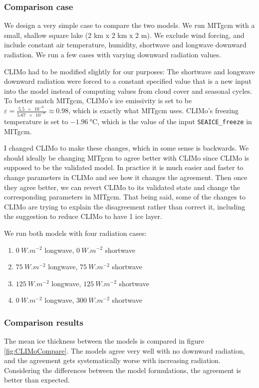 \documentclass[11pt]{article}
\begin{document}
\subsubsection{Comparison case}
We design a very simple case to compare the two models. We run MITgcm with a small, shallow square lake (2 km x 2 km x 2 m). We exclude wind forcing, and include constant air temperature, humidity, shortwave and longwave downward radiation. We run a few cases with varying downward radiation values.

CLIMo had to be modified slightly for our purposes: The shortwave and longwave downward radiation were forced to a constant specified value that is a new input into the model instead of computing values from cloud cover and seasonal cycles. To better match MITgcm, CLIMo's ice emissivity is set to be $\varepsilon = \frac{\SI{5.5e-8}{}}{\SI{5.67e-8}{}} \approx 0.98$, which is exactly what MITgcm uses. CLIMo's freezing temperature is set to $\SI{-1.96}{\celsius}$, which is the value of the input \verb|SEAICE_freeze| in MITgcm.

I changed CLIMo to make these changes, which in some sense is backwards. We should ideally be changing MITgcm to agree better with CLIMo since CLIMo is supposed to be the validated model. In practice it is much easier and faster to change parameters in CLIMo and see how it changes the agreement. Then once they agree better, we can revert CLIMo to its validated state and change the corresponding parameters in MITgcm. That being said, some of the changes to CLIMo are trying to explain the disagreement rather than correct it, including the suggestion to reduce CLIMo to have 1 ice layer.

We run both models with four radiation cases:
\begin{enumerate}
\item{$\SI{0}{W.m^{-2}}$ longwave, $\SI{0}{W.m^{-2}}$ shortwave}
\item{$\SI{75}{W.m^{-2}}$ longwave, $\SI{75}{W.m^{-2}}$ shortwave}
\item{$\SI{125}{W.m^{-2}}$ longwave, $\SI{125}{W.m^{-2}}$ shortwave}
\item{$\SI{0}{W.m^{-2}}$ longwave, $\SI{300}{W.m^{-2}}$ shortwave}
\end{enumerate}

\subsubsection{Comparison results}
The mean ice thickness between the models is compared in figure \ref{fig:CLIMoCompare}. The models agree very well with no downward radiation, and the agreement gets systematically worse with increasing radiation. Considering the differences between the model formulations, the agreement is better than expected.
\end{document}
